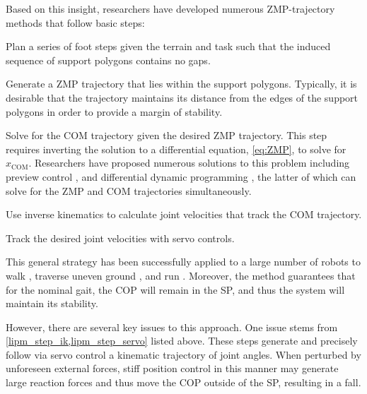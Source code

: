 Based on this insight, researchers have developed numerous ZMP-trajectory
methods that follow  basic steps:
\begin{steps}
    \item Plan a series of foot steps given the terrain and task such that the
    induced sequence of support polygons contains no
    gaps.\label{lipm_step_foot_plan}

    \item Generate a ZMP trajectory that lies within the support polygons.
    Typically, it is desirable that the trajectory maintains its distance from
    the edges of the support polygons in order to provide a margin of
    stability.\label{lipm_step_zmp_traj}

    \item Solve for the COM trajectory given the desired ZMP trajectory. This
    step requires inverting the solution to a differential equation,
    \cref{eq:ZMP}, to solve for $x_\textrm{COM}$. Researchers have proposed
    numerous solutions to this problem including preview control
    \citep{kajita2003biped}, and differential dynamic programming
    \citep{feng2015optimization}, the latter of which can solve for the ZMP and
    COM trajectories simultaneously.\label{lipm_step_com_traj}
    
    \item Use inverse kinematics to calculate joint velocities that track the
    COM trajectory.\label{lipm_step_ik}

    \item Track the desired joint velocities with servo
    controls.\label{lipm_step_servo}
\end{steps}

This general strategy has been successfully applied to a large number of robots
to walk \citep{hirai1998development}, traverse uneven ground
\citep{shimmyo2010biped}, and run \citep{kajita2007zmp}. Moreover, the method
guarantees that for the nominal gait, the COP will remain in the SP, and thus
the system will maintain its stability.

However, there are several key issues to this approach. One issue stems from
\cref{lipm_step_ik,lipm_step_servo} listed above. These steps generate and
precisely follow via servo control a kinematic trajectory of joint angles. When
perturbed by unforeseen external forces, stiff position control in this manner
may generate large reaction forces and thus move the COP outside of the SP,
resulting in a fall. 

